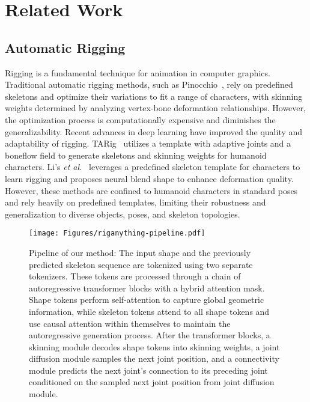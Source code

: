 \section{Related Work}

\subsection{Automatic Rigging}

Rigging is a fundamental technique for animation in computer graphics.
% 
Traditional automatic rigging methods, such as Pinocchio~\cite{pinocchio}, rely on predefined skeletons and optimize their variations to fit a range of characters, with skinning weights determined by analyzing vertex-bone deformation relationships.
% 
However, the optimization process is computationally expensive and diminishes the generalizability.
% 
Recent advances in deep learning have improved the quality and adaptability of rigging.
% 
TARig~\cite{ma2023tarig} utilizes a template with adaptive joints and a boneflow field to generate skeletons and skinning weights for humanoid characters.
% 
Li's \textit{et al.}~\cite{li2021learning} leverages a predefined skeleton template for characters to learn rigging and proposes neural blend shape to enhance deformation quality.
% 
However, these methods are confined to humanoid characters in standard poses and rely heavily on predefined templates, limiting their robustness and generalization to diverse objects, poses, and skeleton topologies.
% 
% 

\begin{figure*}[t]
  \centering
  \texttt{[image: Figures/riganything-pipeline.pdf]}
  \caption{Pipeline of our method: The input shape and the previously predicted skeleton sequence are tokenized using two separate tokenizers. These tokens are processed through a chain of autoregressive transformer blocks with a hybrid attention mask. Shape tokens perform self-attention to capture global geometric information, while skeleton tokens attend to all shape tokens and use causal attention within themselves to maintain the autoregressive generation process. After the transformer blocks, a skinning module decodes shape tokens into skinning weights, a joint diffusion module samples the next joint position, and a connectivity module predicts the next joint's connection to its preceding joint conditioned on the sampled next joint position from joint diffusion module.}
  \label{fig:main_pipeline}
  \vspace{-3mm}
\end{figure*}

